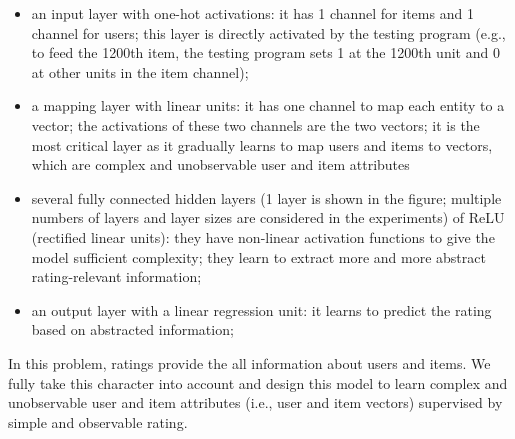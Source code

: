 \documentclass[letterpaper]{article}
\begin{document}
\begin{itemize}
	\item an input layer with one-hot activations: it has 1 channel for items 
	and 1 channel for users;
	this layer is directly activated by the testing program (e.g., to feed the 
	1200th item, the testing program sets 1 at the 1200th unit and 0 at other 	
	units in the item channel);
	\item a mapping layer with linear units: it has one channel to map each 
	entity to a vector;
	the activations of these two channels are the two vectors;
	it is the most critical layer as it gradually learns to map users and items 
	to vectors, which are complex and unobservable user and item attributes
	\item several fully connected hidden layers (1 layer is shown in the figure;
	multiple numbers of layers and layer sizes are considered in the 
	experiments) of ReLU (rectified linear units):
	they have non-linear activation functions to give the model sufficient 
	complexity;
	they learn to extract more and more abstract rating-relevant information;
	\item an output layer with a linear regression unit: it learns to predict 
	the rating based on abstracted information;
\end{itemize}
In this problem, ratings provide the all information about users and items.
We fully take this character into account and design this model to learn 
complex and unobservable user and item attributes (i.e., user and item vectors) 
supervised by simple and observable rating.
\end{document}
